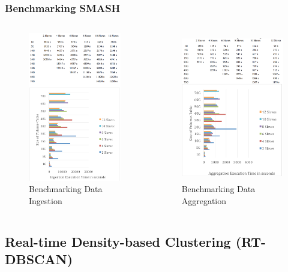 \begin{frame}
    \frametitle{Benchmarking SMASH}
    \begin{columns}
             \vspace{-0.5cm}
             \begin{figure}
                 \centering
                 \includegraphics[height=6.5cm]{resource/figures/benchmark_ingest.png}
                 \vspace{-0.4cm}
                 \caption{\tiny Benchmarking Data Ingestion}
             \end{figure}
             \vspace{-0.5cm}
             \begin{figure}
                 \centering
                 \includegraphics[height=6.5cm]{resource/figures/benchmark_aggregate.png}
                 \vspace{-0.4cm}
                 \caption{\tiny Benchmarking Data Aggregation}
             \end{figure}
    \end{columns}
\end{frame}

\subsection{Real-time Density-based Clustering (RT-DBSCAN)}

